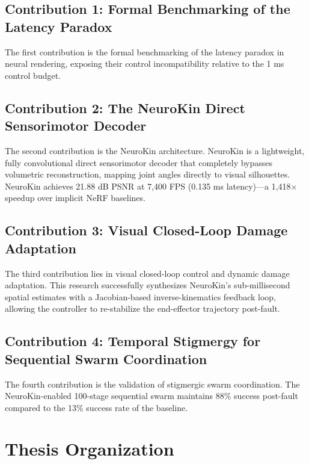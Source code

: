 \documentclass[12pt,a4paper,oneside]{report}
\begin{document}
\subsection{Contribution 1: Formal Benchmarking of the Latency Paradox}

The first contribution is the formal benchmarking of the latency paradox in neural rendering, exposing their control incompatibility relative to the 1 ms control budget.

\subsection{Contribution 2: The NeuroKin Direct Sensorimotor Decoder}

The second contribution is the NeuroKin architecture. NeuroKin is a lightweight, fully convolutional direct sensorimotor decoder that completely bypasses volumetric reconstruction, mapping joint angles directly to visual silhouettes. NeuroKin achieves 21.88 dB PSNR at 7,400 FPS (0.135 ms latency)---a 1,418$\times$ speedup over implicit NeRF baselines.

\subsection{Contribution 3: Visual Closed-Loop Damage Adaptation}

The third contribution lies in visual closed-loop control and dynamic damage adaptation. This research successfully synthesizes NeuroKin's sub-millisecond spatial estimates with a Jacobian-based inverse-kinematics feedback loop, allowing the controller to re-stabilize the end-effector trajectory post-fault.

\subsection{Contribution 4: Temporal Stigmergy for Sequential Swarm Coordination}

The fourth contribution is the validation of stigmergic swarm coordination. The NeuroKin-enabled 100-stage sequential swarm maintains 88\% success post-fault compared to the 13\% success rate of the baseline.

\section{Thesis Organization}
\label{sec:thesis_organization_intro}
\end{document}
